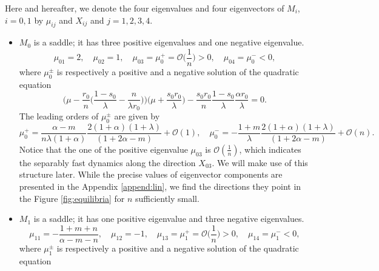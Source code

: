 \documentclass[a4paper,11pt]{article}
\def\BO{{\mathcal{O}}}
\theoremstyle{remark}
\begin{document}
Here and hereafter, we denote the four eigenvalues and four eigenvectors of $M_i$, $i=0,1$  by $\mu_{ij}$ and $X_{ij}$ and $j=1,2,3,4$. %
\begin{itemize}
 \item $M_0$ is a saddle; it has three positive eigenvalues and one negative eigenvalue. 
 \begin{equation} \label{eq:eigM0}
  \mu_{01} = 2, \quad \mu_{02}=1, \quad \mu_{03}=\mu_0^+=\BO\Big(\frac{1}{n}\Big)>0, \quad \mu_{04}=\mu_0^{-}<0,
 \end{equation}
  where $\mu_0^\pm$ is respectively a positive and a negative solution of the quadratic equation
 $$ \Big(\mu - \frac{r_0}{n}\Big(\frac{1-s_0}{\lambda}-\frac{n}{\lambda r_0}\Big)\Big)\Big(\mu + \frac{s_0r_0}{\lambda}\Big) - \frac{s_0r_0}{n} \frac{1-s_0}{\lambda}\frac{\alpha r_0}{\lambda} = 0.$$
The leading orders of $\mu_0^\pm$ are given by
$$\mu_0^+ = \frac{\alpha-m}{n\lambda(1+\alpha)}\frac{2(1+\alpha)(1+\lambda)}{(1+2\alpha-m)}+\BO(1), \quad\mu_0^- = -\frac{1+m}{\lambda}\frac{2(1+\alpha)(1+\lambda)}{(1+2\alpha-m)}  + \BO(n).$$
Notice that the one of the positive eigenvalue $\mu_{03}$ is $\mathcal{O}( \frac{1}{n})$, which indicates the separably fast dynamics along the direction $X_{03}$. We will make use of this structure later.
 While the precise values of eigenvector components are presented in the Appendix \ref{append:lin}, we find the directions they point in the Figure \ref{fig:equilibria} for $n$ sufficiently small.
 \item $M_1$ is a saddle; it has one positive eigenvalue and three negative eigenvalues. 
\begin{equation} \label{eq:eigM1}
 \mu_{11}=-\frac{1+m+n}{\alpha-m-n}, \quad \mu_{12}=-1, \quad \mu_{13}=\mu_1^+=\BO\Big(\frac{1}{n}\Big)>0, \quad \mu_{14}=\mu_1^{-}<0,
\end{equation}
where $\mu_1^\pm$ is respectively a positive and a negative solution of the quadratic equation

\end{itemize}
\end{document}
